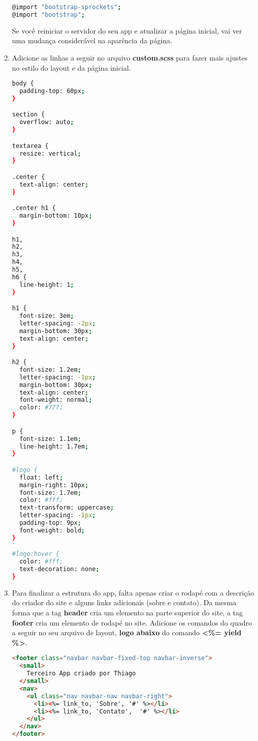 \documentclass[a4paper,12pt]{article}
\begin{document}
\begin{enumerate}
  \begin{lstlisting}[language=Bash, title={app/assets/stylesheets/custom.scss}]
@import "bootstrap-sprockets";
@import "bootstrap";
  \end{lstlisting}

  Se você reiniciar o servidor do seu app e atualizar a página inicial, vai ver uma mudança considerável na aparência da página.

  \item Adicione as linhas a seguir no arquivo \textbf{custom.scss} para fazer mais ajustes no estilo do layout e da página inicial.

  \begin{lstlisting}[language=Bash, title={app/assets/stylesheets/custom.scss}]
body {
  padding-top: 60px;
}

section {
  overflow: auto;
}

textarea {
  resize: vertical;
}

.center {
  text-align: center;
}

.center h1 {
  margin-bottom: 10px;
}

h1,
h2,
h3,
h4,
h5,
h6 {
  line-height: 1;
}

h1 {
  font-size: 3em;
  letter-spacing: -2px;
  margin-bottom: 30px;
  text-align: center;
}

h2 {
  font-size: 1.2em;
  letter-spacing: -1px;
  margin-bottom: 30px;
  text-align: center;
  font-weight: normal;
  color: #777;
}

p {
  font-size: 1.1em;
  line-height: 1.7em;
}

#logo {
  float: left;
  margin-right: 10px;
  font-size: 1.7em;
  color: #fff;
  text-transform: uppercase;
  letter-spacing: -1px;
  padding-top: 9px;
  font-weight: bold;
}

#logo:hover {
  color: #fff;
  text-decoration: none;
}
  \end{lstlisting}

  \item Para finalizar a estrutura do app, falta apenas criar o rodapé com a descrição do criador do site e alguns links adicionais (sobre e contato). Da mesma forma que a tag \textbf{header} cria um elemento na parte superior do site, a tag \textbf{footer} cria um elemento de rodapé no site. Adicione os comandos do quadro a seguir no seu arquivo de layout, \textbf{logo abaixo} do comando \textbf{<\%= yield \%>}.

  \pagebreak

  \begin{lstlisting}[language=html, title={app/views/layouts/application.html.erb}, basicstyle=\scriptsize]
<footer class="navbar navbar-fixed-top navbar-inverse">
  <small>
    Terceiro App criado por Thiago
  </small>
  <nav>
    <ul class="nav navbar-nav navbar-right">
      <li><%= link_to, 'Sobre', '#' %></li>
      <li><%= link_to, 'Contato',  '#' %></li>
    </ul>
  </nav>
</footer>
  \end{lstlisting}


\end{enumerate}
\end{document}
